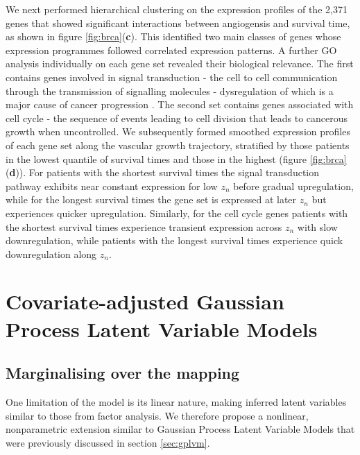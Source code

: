 We next performed hierarchical clustering on the expression profiles of the 2,371 genes that showed significant interactions between angiogensis and survival time, as shown in figure \ref{fig:brca}(\textbf{c}). This identified two main classes of genes whose expression programmes followed correlated expression patterns. %
A further GO analysis individually on each gene set revealed their biological relevance.
The first contains genes involved in signal transduction - the cell to cell communication through the transmission of signalling molecules - dysregulation of which is a major cause of cancer progression \citep{Sever2015-ru}.
The second set contains genes associated with cell cycle - the sequence of events leading to cell division that leads to cancerous growth when uncontrolled. We subsequently formed smoothed expression profiles of each gene set along the vascular growth trajectory, stratified by those patients in the lowest quantile of survival times and those in the highest (figure \ref{fig:brca}(\textbf{d})). For patients with the shortest survival times the signal transduction pathway exhibits near constant expression for low $z_n$ before gradual upregulation, while for the longest survival times the gene set is expressed at later $z_n$ but experiences quicker upregulation. Similarly, for the cell cycle genes patients with the shortest survival times experience transient expression across $z_n$ with slow downregulation, while patients with the longest survival times experience quick downregulation along $z_n$.

\section{Covariate-adjusted Gaussian Process Latent Variable Models}


\subsection{Marginalising over the mapping}

One limitation of the model is its linear nature, making inferred latent variables similar to those from factor analysis. We therefore propose a nonlinear, nonparametric extension similar to Gaussian Process Latent Variable Models \citep{Lawrence2005-cu} that were previously discussed in section \ref{sec:gplvm}.



